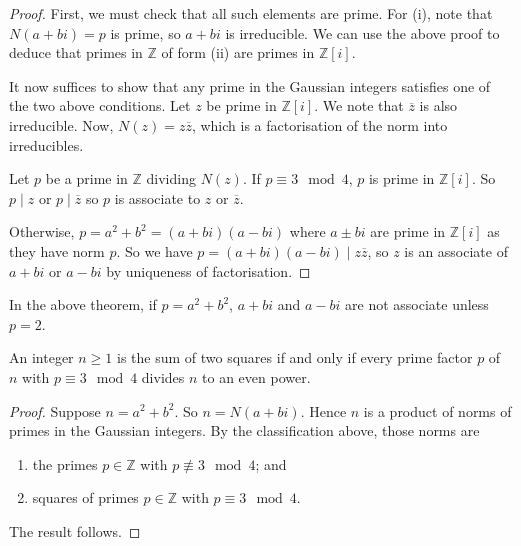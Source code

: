 \begin{proof}
	First, we must check that all such elements are prime.
	For (i), note that \( N(a+bi) = p \) is prime, so \( a+bi \) is irreducible.
	We can use the above proof to deduce that primes in \( \mathbb Z \) of form (ii) are primes in \( \mathbb Z[i] \).

	It now suffices to show that any prime in the Gaussian integers satisfies one of the two above conditions.
	Let \( z \) be prime in \( \mathbb Z[i] \).
	We note that \( \overline z \) is also irreducible.
	Now, \( N(z) = z\overline z \), which is a factorisation of the norm into irreducibles.

	Let \( p \) be a prime in \( \mathbb Z \) dividing \( N(z) \).
	If \( p \equiv 3 \mod 4 \), \( p \) is prime in \( \mathbb Z[i] \).
	So \( p \mid z \) or \( p \mid \overline z \) so \( p \) is associate to \( z \) or \( \overline z \).

	Otherwise, \( p = a^2 + b^2 = (a+bi)(a-bi) \) where \( a \pm bi \) are prime in \( \mathbb Z[i] \) as they have norm \( p \).
	So we have \( p = (a+bi)(a-bi) \mid z \overline z \), so \( z \) is an associate of \( a+bi \) or \( a-bi \) by uniqueness of factorisation.
\end{proof}
\begin{remark}
	In the above theorem, if \( p = a^2 + b^2 \), \( a+bi \) and \( a-bi \) are not associate unless \( p = 2 \).
\end{remark}
\begin{corollary}
	An integer \( n \geq 1 \) is the sum of two squares if and only if every prime factor \( p \) of \( n \) with \( p \equiv 3 \mod 4 \) divides \( n \) to an even power.
\end{corollary}
\begin{proof}
	Suppose \( n = a^2 + b^2 \).
	So \( n = N(a+bi) \).
	Hence \( n \) is a product of norms of primes in the Gaussian integers.
	By the classification above, those norms are
	\begin{enumerate}
		\item the primes \( p \in \mathbb Z \) with \( p \not\equiv 3 \mod 4 \); and
		\item squares of primes \( p \in \mathbb Z \) with \( p \equiv 3 \mod 4 \).
	\end{enumerate}
	The result follows.
\end{proof}
